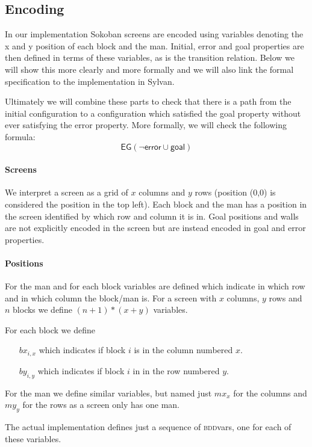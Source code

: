 \subsection{Encoding}
In our implementation Sokoban screens are encoded using variables denoting the
x and y position of each block and the man. Initial, error and goal properties
are then defined in terms of these variables, as is the transition relation. 
Below we will show this more 
clearly and more formally and we will also link the formal specification to the
implementation in Sylvan.

Ultimately we will combine these parts to check that there is a path from the
initial configuration to a configuration which satisfied the goal property 
without ever satisfying the error property. More formally, we will check the
following formula:
\begin{equation}\label{eq:eg_end}
	\mathsf{EG (\neg error \cup goal)}
\end{equation}

\paragraph{Screens} We interpret a screen as a grid of $x$ columns and $y$ rows
(position (0,0) is considered the position in the top left).
Each block and the man has a position in the screen identified by which row and
column it is in. Goal positions and walls are not explicitly encoded in the 
screen but are instead encoded in goal and error properties.

\paragraph{Positions} For the man and for each block variables are defined which
indicate in which row and in which column the block/man is. For a screen with
$x$ columns, $y$ rows and $n$ blocks we define $(n+1)*(x+y)$ 
variables. 

For each block we define
\begin{itemize}
	\item[$bx_{i,x}$] which indicates if block $i$ is in the column numbered $x$.
	\item[$by_{i,y}$] which indicates if block $i$ in in the row numbered $y$.
\end{itemize}
For the man we define similar variables, but named just $mx_x$ for the columns
and $my_y$ for the rows as a screen only has one man.

The actual implementation defines just a sequence of \textsc{bdd}vars, one for 
each of these variables. 

